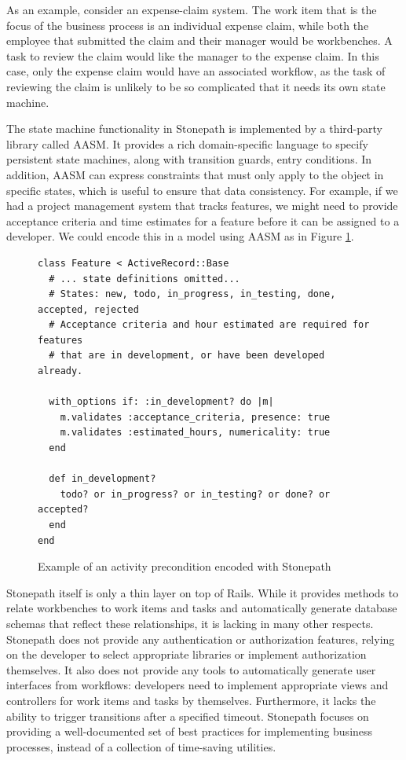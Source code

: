 \documentclass[document.tex]{subfiles}
\begin{document}
As an example, consider an expense-claim system. The work item that is the focus of the business process is an individual expense claim, while both the employee that submitted the claim and their manager would be workbenches. A task to review the claim would like the manager to the expense claim. In this case, only the expense claim would have an associated workflow, as the task of reviewing the claim is unlikely to be so complicated that it needs its own state machine.

The state machine functionality in Stonepath is implemented by a third-party library called AASM. It provides a rich domain-specific language to specify persistent state machines, along with transition guards, entry conditions. In addition, AASM can express constraints that must only apply to the object in specific states, which is useful to ensure that data consistency. For example, if we had a project management system that tracks features, we might need to provide acceptance criteria and time estimates for a feature before it can be assigned to a developer. We could encode this in a model using AASM as in Figure
\ref{fig:stonepath-aasm}.


\begin{figure}[!ht]
  \caption{Example of an activity precondition encoded with Stonepath}
  \label{fig:stonepath-aasm}
  \begin{lstlisting}
class Feature < ActiveRecord::Base
  # ... state definitions omitted...
  # States: new, todo, in_progress, in_testing, done, accepted, rejected
  # Acceptance criteria and hour estimated are required for features
  # that are in development, or have been developed already.

  with_options if: :in_development? do |m|
    m.validates :acceptance_criteria, presence: true
    m.validates :estimated_hours, numericality: true
  end

  def in_development?
    todo? or in_progress? or in_testing? or done? or accepted?
  end
end
  \end{lstlisting}
\end{figure}

Stonepath itself is only a thin layer on top of Rails. While it provides methods to relate workbenches to work items and tasks and automatically generate database schemas that reflect these relationships, it is lacking in many other respects. Stonepath does not provide any authentication or authorization features, relying on the developer to select appropriate libraries or implement authorization themselves. It also does not provide any tools to automatically generate user interfaces from workflows: developers need to implement appropriate views and controllers for work items and tasks by themselves. Furthermore, it lacks the ability to trigger transitions after a specified timeout. Stonepath focuses on providing a well-documented set of best practices for implementing business processes, instead of a collection of time-saving utilities.
\end{document}
